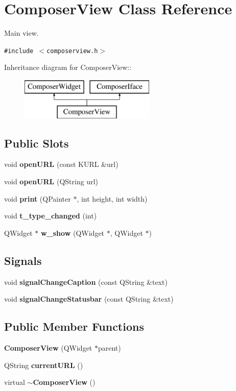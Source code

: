 \section{Composer\-View Class Reference}
\label{classComposerView}
Main view.  


{\tt \#include $<$composerview.h$>$}

Inheritance diagram for Composer\-View::\begin{figure}[H]
\begin{center}
\leavevmode
\includegraphics[height=2cm]{classComposerView}
\end{center}
\end{figure}
\subsection*{Public Slots}
\begin{CompactItemize}
\item 
void {\bf open\-URL} (const KURL \&url)
\item 
void {\bf open\-URL} (QString url)
\item 
void {\bf print} (QPainter $\ast$, int height, int width)
\item 
void {\bf t\_\-type\_\-changed} (int)
\item 
QWidget $\ast$ {\bf w\_\-show} (QWidget $\ast$, QWidget $\ast$)
\end{CompactItemize}
\subsection*{Signals}
\begin{CompactItemize}
\item 
void {\bf signal\-Change\-Caption} (const QString \&text)
\item 
void {\bf signal\-Change\-Statusbar} (const QString \&text)
\end{CompactItemize}
\subsection*{Public Member Functions}
\begin{CompactItemize}
\item 
{\bf Composer\-View} (QWidget $\ast$parent)
\item 
QString {\bf current\-URL} ()
\item 
virtual {\bf $\sim$Composer\-View} ()
\end{CompactItemize}
